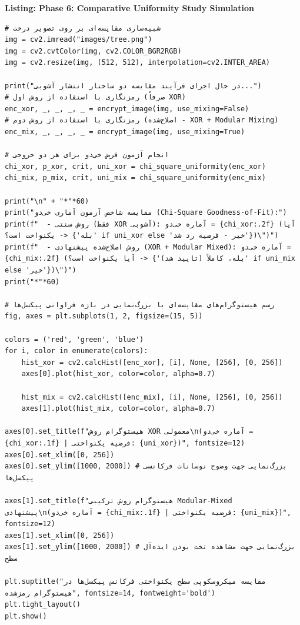 \begin{latin}
\noindent\textbf{Listing: Phase 6: Comparative Uniformity Study Simulation}
\begin{verbatim}
# شبیه‌سازی مقایسه‌ای بر روی تصویر درخت
img = cv2.imread("images/tree.png")
img = cv2.cvtColor(img, cv2.COLOR_BGR2RGB)
img = cv2.resize(img, (512, 512), interpolation=cv2.INTER_AREA)

print("در حال اجرای فرآیند مقایسه دو ساختار انتشار آشوبی...")
# رمزنگاری با استفاده از روش اول (صرفاً XOR)
enc_xor, _, _, _, _ = encrypt_image(img, use_mixing=False)
# رمزنگاری با استفاده از روش دوم (اصلاح‌شده - XOR + Modular Mixing)
enc_mix, _, _, _, _ = encrypt_image(img, use_mixing=True)

# انجام آزمون فرض خی‌دو برای هر دو خروجی
chi_xor, p_xor, crit, uni_xor = chi_square_uniformity(enc_xor)
chi_mix, p_mix, crit, uni_mix = chi_square_uniformity(enc_mix)

print("\n" + "*"*60)
print("مقایسه شاخص آزمون آماری خی‌دو (Chi-Square Goodness-of-Fit):")
print(f"  - روش سنتی (فقط XOR آشوبی): آماره خی‌دو = {chi_xor:.2f} (آیا یکنواخت است؟ -> {'بله' if uni_xor else 'خیر - فرضیه رد شد'})\")")
print(f"  - روش اصلاح‌شده پیشنهادی (XOR + Modular Mixed): آماره خی‌دو = {chi_mix:.2f} (آیا یکنواخت است؟ -> {'بله، کاملاً (تایید شد)' if uni_mix else 'خیر'})\")")
print("*"*60)

# رسم هیستوگرام‌های مقایسه‌ای با بزرگ‌نمایی در بازه فراوانی پیکسل‌ها
fig, axes = plt.subplots(1, 2, figsize=(15, 5))

colors = ('red', 'green', 'blue')
for i, color in enumerate(colors):
    hist_xor = cv2.calcHist([enc_xor], [i], None, [256], [0, 256])
    axes[0].plot(hist_xor, color=color, alpha=0.7)
    
    hist_mix = cv2.calcHist([enc_mix], [i], None, [256], [0, 256])
    axes[1].plot(hist_mix, color=color, alpha=0.7)
    
axes[0].set_title(f"هیستوگرام روش XOR معمولی\n(آماره خی‌دو = {chi_xor:.1f} | فرضیه یکنواختی: {uni_xor})", fontsize=12)
axes[0].set_xlim([0, 256])
axes[0].set_ylim([1000, 2000]) # بزرگ‌نمایی جهت وضوح نوسانات فرکانسی پیکسل‌ها

axes[1].set_title(f"هیستوگرام روش ترکیبی Modular-Mixed پیشنهادی\n(آماره خی‌دو = {chi_mix:.1f} | فرضیه یکنواختی: {uni_mix})", fontsize=12)
axes[1].set_xlim([0, 256])
axes[1].set_ylim([1000, 2000]) # بزرگ‌نمایی جهت مشاهده تخت بودن ایده‌آل سطح

plt.suptitle("مقایسه میکروسکوپی سطح یکنواختی فرکانس پیکسل‌ها در هیستوگرام رمزشده", fontsize=14, fontweight='bold')
plt.tight_layout()
plt.show()
\end{verbatim}
\end{latin}

